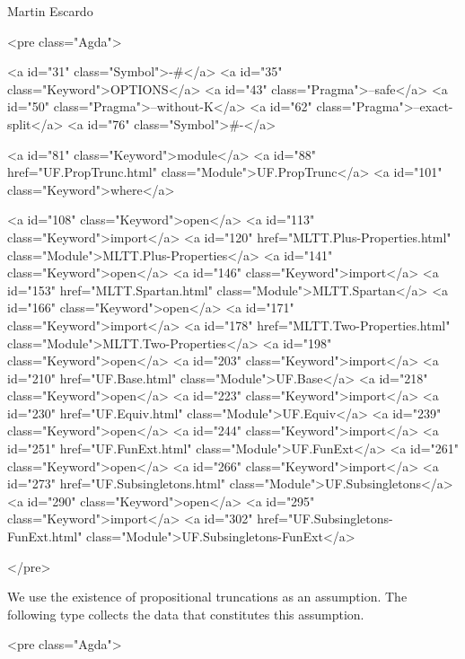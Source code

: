 Martin Escardo

<pre class="Agda">

<a id="31" class="Symbol">{-#</a> <a id="35" class="Keyword">OPTIONS</a> <a id="43" class="Pragma">--safe</a> <a id="50" class="Pragma">--without-K</a> <a id="62" class="Pragma">--exact-split</a> <a id="76" class="Symbol">#-}</a>

<a id="81" class="Keyword">module</a> <a id="88" href="UF.PropTrunc.html" class="Module">UF.PropTrunc</a> <a id="101" class="Keyword">where</a>

<a id="108" class="Keyword">open</a> <a id="113" class="Keyword">import</a> <a id="120" href="MLTT.Plus-Properties.html" class="Module">MLTT.Plus-Properties</a>
<a id="141" class="Keyword">open</a> <a id="146" class="Keyword">import</a> <a id="153" href="MLTT.Spartan.html" class="Module">MLTT.Spartan</a>
<a id="166" class="Keyword">open</a> <a id="171" class="Keyword">import</a> <a id="178" href="MLTT.Two-Properties.html" class="Module">MLTT.Two-Properties</a>
<a id="198" class="Keyword">open</a> <a id="203" class="Keyword">import</a> <a id="210" href="UF.Base.html" class="Module">UF.Base</a>
<a id="218" class="Keyword">open</a> <a id="223" class="Keyword">import</a> <a id="230" href="UF.Equiv.html" class="Module">UF.Equiv</a>
<a id="239" class="Keyword">open</a> <a id="244" class="Keyword">import</a> <a id="251" href="UF.FunExt.html" class="Module">UF.FunExt</a>
<a id="261" class="Keyword">open</a> <a id="266" class="Keyword">import</a> <a id="273" href="UF.Subsingletons.html" class="Module">UF.Subsingletons</a>
<a id="290" class="Keyword">open</a> <a id="295" class="Keyword">import</a> <a id="302" href="UF.Subsingletons-FunExt.html" class="Module">UF.Subsingletons-FunExt</a>

</pre>

We use the existence of propositional truncations as an
assumption. The following type collects the data that constitutes this
assumption.

<pre class="Agda">

